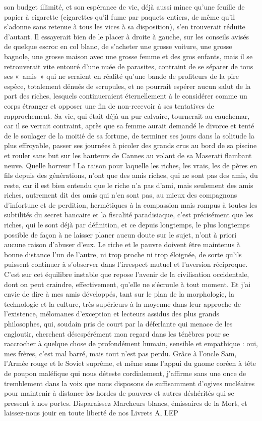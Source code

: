 son budget illimité, et son espérance de vie, déjà aussi mince qu’une feuille de papier à cigarette (cigarettes qu’il fume par paquets entiers, de même qu’il s’adonne sans retenue à tous les vices à sa disposition), s’en trouverait réduite d’autant. Il essayerait bien de le placer à droite à gauche, sur les conseils avisés de quelque escroc en col blanc, de s’acheter une grosse voiture, une grosse bagnole, une grosse maison avec une grosse femme et des gros enfants, mais il se retrouverait vite entouré d’une nuée de parasites, contraint de se séparer de tous ses «~amis~» qui ne seraient en réalité qu’une bande de profiteurs de la pire espèce, totalement dénués de scrupules, et ne pourrait espérer aucun salut de la part des riches, lesquels continueraient éternellement à le considérer comme un corps étranger et opposer une fin de non-recevoir à ses tentatives de rapprochement. Sa vie, qui était déjà un pur calvaire, tournerait au cauchemar, car il se verrait contraint, après que sa femme aurait demandé le divorce et tenté de le soulager de la moitié de sa fortune, de terminer ses jours dans la solitude la plus effroyable, passer ses journées à picoler des grands crus au bord de sa piscine et rouler sans but sur les hauteurs de Cannes au volant de sa Maserati flambant neuve. Quelle horreur ! La raison pour laquelle les riches, les vrais, les de pères en fils depuis des générations, n’ont que des amis riches, qui ne sont pas des amis, du reste, car il est bien entendu que le riche n’a pas d’ami, mais seulement des amis riches, autrement dit des amis qui n’en sont pas, au mieux des compagnons d’infortune et de perdition, hermétiques à la compassion mais rompus à toutes les subtilités du secret bancaire et la fiscalité paradisiaque, c’est précisément que les riches, qui le sont déjà par définition, et ce depuis longtemps, le plus longtemps possible de façon à ne laisser planer aucun doute sur le sujet, n’ont à priori aucune raison d’abuser d’eux. Le riche et le pauvre doivent être maintenus à bonne distance l’un de l’autre, ni trop proche ni trop éloignée, de sorte qu’ils puissent continuer à s’observer dans l’irrespect mutuel et l’aversion réciproque. C’est sur cet équilibre instable que repose l’avenir de la civilisation occidentale, dont on peut craindre, effectivement, qu’elle ne s’écroule à tout moment. Et j’ai envie de dire à mes amis développés, tant sur le plan de la morphologie, la technologie et la culture, très supérieurs à la moyenne dans leur approche de l’existence, mélomanes d’exception et lecteurs assidus des plus grands philosophes, qui, soudain pris de court par la déferlante qui menace de les engloutir, cherchent désespérément mon regard dans les ténèbres pour se raccrocher à quelque chose de profondément humain, sensible et empathique : oui, mes frères, c’est mal barré, mais tout n’est pas perdu. Grâce à l’oncle Sam, l’Armée rouge et le Soviet suprême, et même sans l’appui du gnome coréen à tête de poupon maléfique qui nous déteste cordialement, j’affirme sans une once de tremblement dans la voix que nous disposons de suffisamment d’ogives nucléaires pour maintenir à distance les hordes de pauvres et autres déshérités qui se pressent à nos portes. Disparaissez Marcheurs blancs, émissaires de la Mort, et laissez-nous jouir en toute liberté de nos Livrets A, LEP 